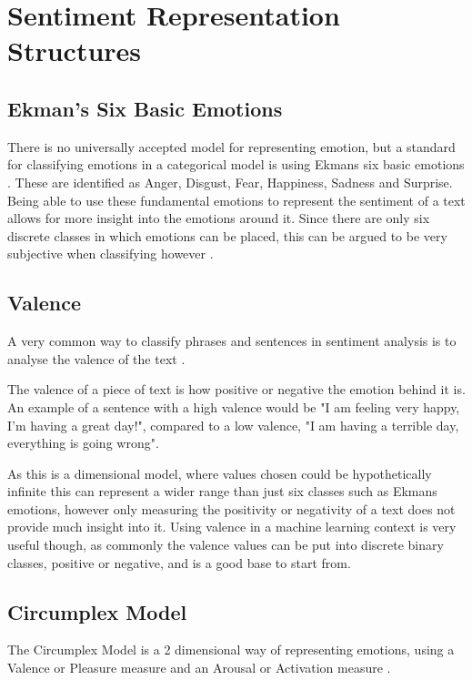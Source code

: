 
\section{Sentiment Representation Structures}
\subsection{Ekman's Six Basic Emotions}

There is no universally accepted model for representing emotion, but a standard for classifying emotions in a categorical model is using Ekmans six basic emotions \cite{Ekman}. These are identified as Anger, Disgust, Fear, Happiness, Sadness and Surprise. Being able to use these fundamental emotions to represent the sentiment of a text allows for more insight into the emotions around it. Since there are only six discrete classes in which emotions can be placed, this can be argued to be very subjective when classifying however \cite{emoBank}.

\subsection{Valence}
A very common way to classify phrases and sentences in sentiment analysis is to analyse the valence of the text \cite{frijda1986emotions}.

The valence of a piece of text is how positive or negative the emotion behind it is. An example of a sentence with a high valence would be "I am feeling very happy, I'm having a great day!", compared to a low valence, "I am having a terrible day, everything is going wrong". 

As this is a dimensional model, where values chosen could be hypothetically infinite this can represent a wider range than just six classes such as Ekmans emotions, however only measuring the positivity or negativity of a text does not provide much insight into it.
Using valence in a machine learning context is very useful though, as commonly the valence values can be put into discrete binary classes, positive or negative, and is a good base to start from.

\subsection{Circumplex Model}
The Circumplex Model is a 2 dimensional way of representing emotions, using a Valence or Pleasure measure and an Arousal or Activation measure \cite{modelOfAffect}.

